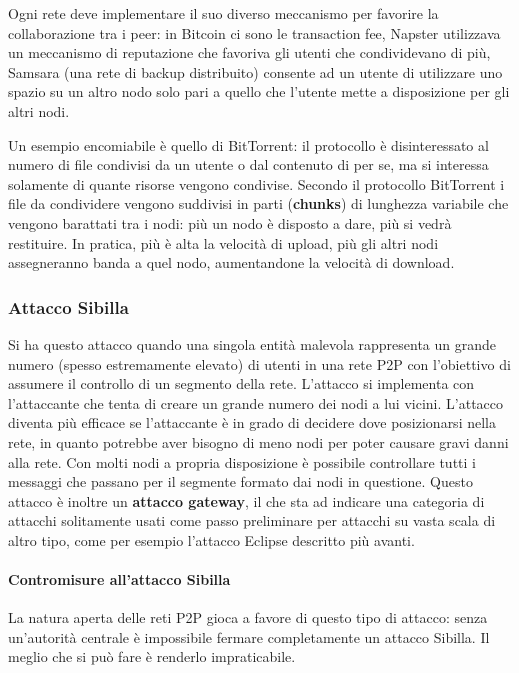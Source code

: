 Ogni rete deve implementare il suo diverso meccanismo per favorire la collaborazione tra i peer: in Bitcoin ci sono le transaction fee, Napster utilizzava un meccanismo di reputazione che favoriva gli utenti che condividevano di più, Samsara (una rete di backup distribuito) consente ad un utente di utilizzare uno spazio su un altro nodo solo pari a quello che l'utente mette a disposizione per gli altri nodi.

Un esempio encomiabile è quello di BitTorrent: il protocollo è disinteressato al numero di file condivisi da un utente o dal contenuto di per se, ma si interessa solamente di quante risorse vengono condivise. Secondo il protocollo BitTorrent i file da condividere vengono suddivisi in parti (\textbf{chunks}) di lunghezza variabile che vengono barattati tra i nodi: più un nodo è disposto a dare, più si vedrà restituire. In pratica, più è alta la velocità di upload, più gli altri nodi assegneranno banda a quel nodo, aumentandone la velocità di download.

\subsubsection{Attacco Sibilla}\label{attacco-sibilla}

Si ha questo attacco quando una singola entità malevola rappresenta un grande numero (spesso estremamente elevato) di utenti in una rete P2P con l'obiettivo di assumere il controllo di un segmento della rete. L'attacco si implementa con l'attaccante che tenta di creare un grande numero dei nodi a lui vicini. L'attacco diventa più efficace se l'attaccante è in grado di decidere dove posizionarsi nella rete, in quanto potrebbe aver bisogno di meno nodi per poter causare gravi danni alla rete. Con molti nodi a propria disposizione è possibile controllare tutti i messaggi che passano per il segmente formato dai nodi in questione. Questo attacco è inoltre un \textbf{attacco gateway}, il che sta ad indicare una categoria di attacchi solitamente usati come passo preliminare per attacchi su vasta scala di altro tipo, come per esempio l'attacco Eclipse descritto più avanti.

\paragraph{Contromisure all'attacco Sibilla}\label{contromisure-allattacco-sibilla}

La natura aperta delle reti P2P gioca a favore di questo tipo di attacco: senza un'autorità centrale è impossibile fermare completamente un attacco Sibilla. Il meglio che si può fare è renderlo impraticabile.

